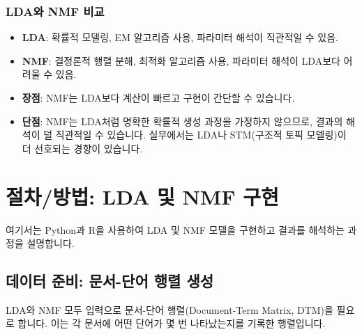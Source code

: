 \documentclass[11pt,a4paper]{article}
\begin{document}
\subsubsection*{LDA와 NMF 비교}
\begin{itemize}
    \item \textbf{LDA}: 확률적 모델링, EM 알고리즘 사용, 파라미터 해석이 직관적일 수 있음.
    \item \textbf{NMF}: 결정론적 행렬 분해, 최적화 알고리즘 사용, 파라미터 해석이 LDA보다 어려울 수 있음.
    \item \textbf{장점}: NMF는 LDA보다 계산이 빠르고 구현이 간단할 수 있습니다.
    \item \textbf{단점}: NMF는 LDA처럼 명확한 확률적 생성 과정을 가정하지 않으므로, 결과의 해석이 덜 직관적일 수 있습니다. 실무에서는 LDA나 STM(구조적 토픽 모델링)이 더 선호되는 경향이 있습니다.
\end{itemize}

\newpage
\section*{절차/방법: LDA 및 NMF 구현}
여기서는 Python과 R을 사용하여 LDA 및 NMF 모델을 구현하고 결과를 해석하는 과정을 설명합니다.

\subsection*{데이터 준비: 문서-단어 행렬 생성}
LDA와 NMF 모두 입력으로 문서-단어 행렬(Document-Term Matrix, DTM)을 필요로 합니다. 이는 각 문서에 어떤 단어가 몇 번 나타났는지를 기록한 행렬입니다.
\end{document}
